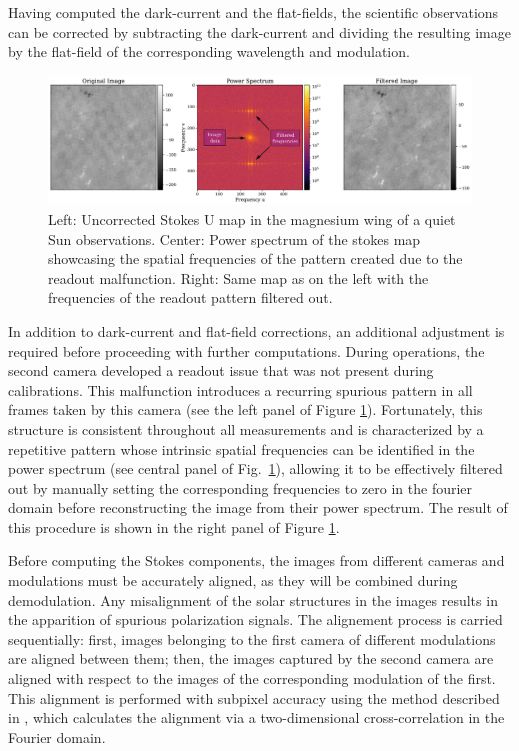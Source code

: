 Having computed the dark-current and the flat-fields, the scientific observations can be corrected by subtracting the dark-current and dividing the resulting image by the flat-field of the corresponding wavelength and modulation. 

\begin{figure}
  \includegraphics[width=\textwidth]{figures/Pipeline/readout_problem.pdf}
  \caption[Readout pattern filtering]{Left: Uncorrected Stokes U map in the magnesium wing of a quiet Sun observations. Center: Power spectrum of the stokes map showcasing the spatial frequencies of the pattern created due to the readout malfunction. Right: Same map as on the left with the frequencies of the readout pattern filtered out.}
    \label{fig_pipeline: readout}
\end{figure}

In addition to dark-current and flat-field corrections, an additional adjustment is required before proceeding with further computations. During operations, the second camera developed a readout issue that was not present during calibrations. This malfunction introduces a recurring spurious pattern in all frames taken by this camera (see the left panel of Figure \ref{fig_pipeline: readout}). Fortunately, this structure is consistent throughout all measurements and is characterized by a repetitive pattern whose intrinsic spatial frequencies can be identified in the power spectrum (see central panel of Fig.~\ref{fig_pipeline: readout}), allowing it to be effectively filtered out by manually setting the corresponding frequencies to zero in the fourier domain before reconstructing the image from their power spectrum. The result of this procedure is shown in the right panel of Figure \ref{fig_pipeline: readout}.  


Before computing the Stokes components, the images from different cameras and modulations must be accurately aligned, as they will be combined during demodulation. Any misalignment of the solar structures in the images results in the apparition of spurious polarization signals. The alignement process is carried sequentially: first, images belonging to the first camera of different modulations are aligned between them; then, the images captured by the second camera are aligned with respect to the images of the corresponding modulation of the first. This alignment is performed with subpixel accuracy using the method described in \cite{alineamiento}, which calculates the alignment via a two-dimensional cross-correlation in the Fourier domain.


